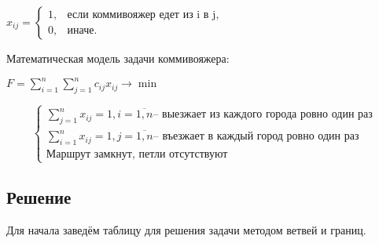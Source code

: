 $ x_{ij} = \begin{cases}
                1, & \text{если коммивояжер едет из i в j}, \\
                0, & \text{иначе}.
        \end{cases} $

Математическая модель задачи коммивояжера:

$ F = \sum\limits_{i=1}^{n} \sum\limits_{j=1}^{n} c_{ij} x_{ij} \to \min $

\[
        \begin{cases}
                \sum\limits_{j=1}^{n} x_{ij} = 1, i = \overline{1, n} \text{-- выезжает из каждого города ровно один раз} \\
                \sum\limits_{i=1}^{n} x_{ij} = 1, j = \overline{1, n} \text{-- въезжает в каждый город ровно один раз}    \\
                \text{Маршрут замкнут, петли отсутствуют}
        \end{cases}
\]

\subsection{Решение}\label{07-lab-solution}

Для начала заведём таблицу для решения задачи методом ветвей и границ.

